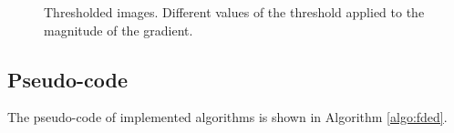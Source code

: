 \documentclass{ipol}
\numberwithin{equation}{section}
\numberwithin{table}{section}
\begin{document}
\begin{figure}[t!]
	\centering
	\quad
	\quad
	\caption{Thresholded images. Different values of the threshold applied to the magnitude of the gradient.}
	\label{fig:thresholding}
\end{figure}



\subsection{Pseudo-code}

The pseudo-code of implemented algorithms is shown in Algorithm \ref{algo:fded}.

\clearpage
\end{document}
